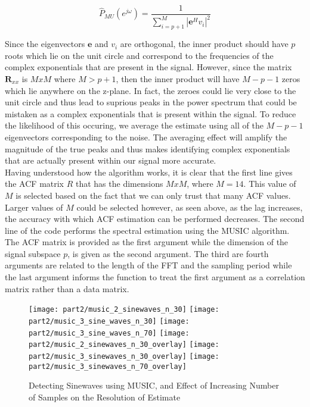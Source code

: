 \begin{equation}
\hat{P}_{MU}(e^{j\omega}) = \frac{1}{\sum_{i=p+1}^M|\textbf{e}^H v_{i}|^2}
\end{equation}

\noindent{}Since the eigenvectors $\textbf{e}$ and $v_{i}$ are orthogonal, the inner product should have $p$ roots which lie on the unit circle and correspond to the frequencies of the complex exponentials that are present in the signal. However, since the matrix $\textbf{R}_{xx}$ is $MxM$ where $M > p + 1$, then the inner product will have $M-p-1$ zeros which lie anywhere on the z-plane. In fact, the zeroes could lie very close to the unit circle and thus lead to suprious peaks in the power spectrum that could be mistaken as a complex exponentials that is present within the signal. To reduce the likelihood of this occuring, we average the estimate using all of the $M-p-1$ eigenvectors corresponding to the noise. The averaging effect will amplify the magnitude of the true peaks and thus makes identifying complex exponentials that are actually present within our signal more accurate. \\

\noindent{}Having understood how the algorithm works, it is clear that the first line gives the ACF matrix $R$ that has the dimensions $MxM$, where $M=14$. This value of $M$ is selected based on the fact that we can only trust that many ACF values. Larger values of $M$ could be selected however, as seen above, as the lag increases, the accuracy with which ACF estimation can be performed decreases. The second line of the code performs the spectral estimation using the MUSIC algorithm. The ACF matrix is provided as the first argument while the dimension of the signal subspace $p$, is given as the second argument. The third are fourth arguments are related to the length of the FFT and the sampling period while the last argument informs the function to treat the first argument as a correlation matrix rather than a data matrix. 

\begin{figure}[H]
\centering{}
\texttt{[image: part2/music\_2\_sinewaves\_n\_30]}
\texttt{[image: part2/music\_3\_sine\_waves\_n\_30]}
\texttt{[image: part2/music\_3\_sine\_waves\_n\_70]}
\texttt{[image: part2/music\_2\_sinewaves\_n\_30\_overlay]}
\texttt{[image: part2/music\_3\_sinewaves\_n\_30\_overlay]}
\texttt{[image: part2/music\_3\_sinewaves\_n\_70\_overlay]}
\caption{Detecting Sinewaves using MUSIC, and Effect of Increasing Number of Samples on the Resolution of Estimate}
\label{fig:music}
\end{figure}

